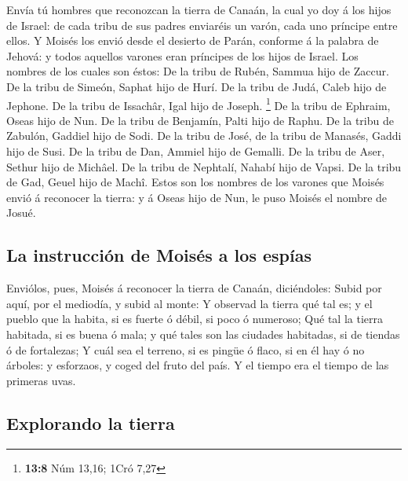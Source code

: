  Envía tú hombres que reconozcan la tierra de Canaán, la
cual yo doy á los hijos de Israel: de cada tribu de sus padres enviaréis
un varón, cada uno príncipe entre ellos.  Y Moisés los
envió desde el desierto de Parán, conforme á la palabra de Jehová: y
todos aquellos varones eran príncipes de los hijos de Israel.
 Los nombres de los cuales son éstos: De la tribu de
Rubén, Sammua hijo de Zaccur.  De la tribu de Simeón,
Saphat hijo de Hurí.  De la tribu de Judá, Caleb hijo de
Jephone.  De la tribu de Issachâr, Igal hijo de Joseph.
\footnote{\textbf{13:8} Núm 13,16; 1Cró 7,27}  De la tribu
de Ephraim, Oseas hijo de Nun.  De la tribu de Benjamín,
Palti hijo de Raphu.  De la tribu de Zabulón, Gaddiel
hijo de Sodi.  De la tribu de José, de la tribu de
Manasés, Gaddi hijo de Susi.  De la tribu de Dan, Ammiel
hijo de Gemalli.  De la tribu de Aser, Sethur hijo de
Michâel.  De la tribu de Nephtalí, Nahabí hijo de Vapsi.
 De la tribu de Gad, Geuel hijo de Machî. 
Estos son los nombres de los varones que Moisés envió á reconocer la
tierra: y á Oseas hijo de Nun, le puso Moisés el nombre de Josué.

\hypertarget{la-instrucciuxf3n-de-moisuxe9s-a-los-espuxedas}{%
\subsection{La instrucción de Moisés a los
espías}\label{la-instrucciuxf3n-de-moisuxe9s-a-los-espuxedas}}

 Enviólos, pues, Moisés á reconocer la tierra de Canaán,
diciéndoles: Subid por aquí, por el mediodía, y subid al monte:
 Y observad la tierra qué tal es; y el pueblo que la
habita, si es fuerte ó débil, si poco ó numeroso;  Qué
tal la tierra habitada, si es buena ó mala; y qué tales son las ciudades
habitadas, si de tiendas ó de fortalezas;  Y cuál sea el
terreno, si es pingüe ó flaco, si en él hay ó no árboles: y esforzaos, y
coged del fruto del país. Y el tiempo era el tiempo de las primeras
uvas.

\hypertarget{explorando-la-tierra}{%
\subsection{Explorando la tierra}\label{explorando-la-tierra}}

